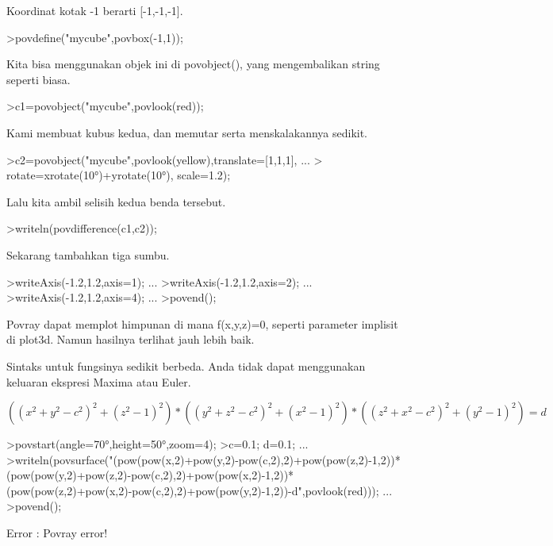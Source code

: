 \begin{eulercomment}
\begin{eulercomment}
Koordinat kotak -1 berarti [-1,-1,-1].
\end{eulercomment}
\begin{eulerprompt}
>povdefine("mycube",povbox(-1,1));
\end{eulerprompt}
\begin{eulercomment}
Kita bisa menggunakan objek ini di povobject(), yang mengembalikan
string seperti biasa.
\end{eulercomment}
\begin{eulerprompt}
>c1=povobject("mycube",povlook(red));
\end{eulerprompt}
\begin{eulercomment}
Kami membuat kubus kedua, dan memutar serta menskalakannya sedikit.
\end{eulercomment}
\begin{eulerprompt}
>c2=povobject("mycube",povlook(yellow),translate=[1,1,1], ...
>  rotate=xrotate(10°)+yrotate(10°), scale=1.2);
\end{eulerprompt}
\begin{eulercomment}
Lalu kita ambil selisih kedua benda tersebut.
\end{eulercomment}
\begin{eulerprompt}
>writeln(povdifference(c1,c2));
\end{eulerprompt}
\begin{eulercomment}
Sekarang tambahkan tiga sumbu.
\end{eulercomment}
\begin{eulerprompt}
>writeAxis(-1.2,1.2,axis=1); ...
>writeAxis(-1.2,1.2,axis=2); ...
>writeAxis(-1.2,1.2,axis=4); ...
>povend();
\end{eulerprompt}
\begin{eulercomment}
Povray dapat memplot himpunan di mana f(x,y,z)=0, seperti parameter
implisit di plot3d. Namun hasilnya terlihat jauh lebih baik.

Sintaks untuk fungsinya sedikit berbeda. Anda tidak dapat menggunakan
keluaran ekspresi Maxima atau Euler.

\end{eulercomment}
\begin{eulerformula}
\[
((x^2+y^2-c^2)^2+(z^2-1)^2)*((y^2+z^2-c^2)^2+(x^ 2-1)^2)*((z^2+x^2-c^2)^2+(y^2-1)^2)=d
\]
\end{eulerformula}
\begin{eulerprompt}
>povstart(angle=70°,height=50°,zoom=4);
>c=0.1; d=0.1; ...
>writeln(povsurface("(pow(pow(x,2)+pow(y,2)-pow(c,2),2)+pow(pow(z,2)-1,2))*(pow(pow(y,2)+pow(z,2)-pow(c,2),2)+pow(pow(x,2)-1,2))*(pow(pow(z,2)+pow(x,2)-pow(c,2),2)+pow(pow(y,2)-1,2))-d",povlook(red))); ...
>povend();
\end{eulerprompt}
\begin{euleroutput}
  Error : Povray error!
  

\end{euleroutput}
\end{eulercomment}
